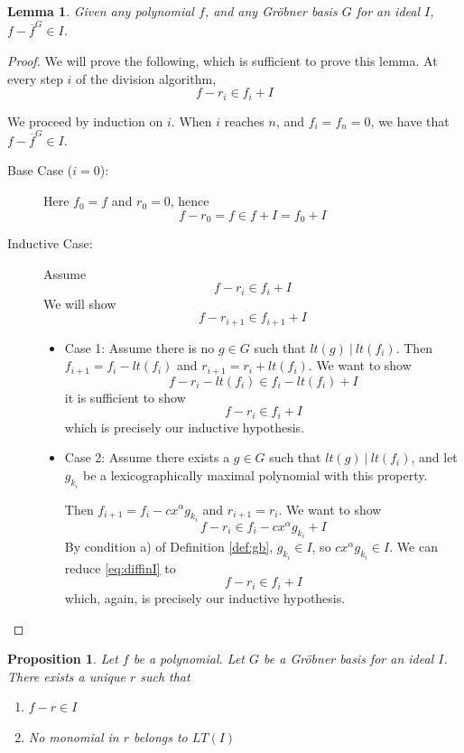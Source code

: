 \documentclass{msthesis}
\newtheorem{lemma}[theorem]{Lemma}
\newtheorem{prop}[theorem]{Proposition}
\theoremstyle{definition}
\begin{document}
\begin{lemma}\label{lemma:remini}
    Given any polynomial $f$, and any Gr\"obner basis $G$ for an ideal $I$, $f - \overline{f}^G \in I$.
\end{lemma}
\begin{proof}
    We will prove the following, which is sufficient to prove this lemma. At every step $i$ of the division algorithm,
    \[ f - r_i \in f_i + I \]

    We proceed by induction on $i$.  When $i$ reaches $n$, and $f_i = f_n = 0$, we have that $f - \overline{f}^G \in I$.

    \begin{description}
        \item[Base Case ($i = 0$):] Here $f_0 = f$ and $r_0 = 0$, hence 
        \[ f-r_0 = f \in f + I = f_0 + I \]
        \item[Inductive Case: ] Assume 
        \[ f - r_i \in f_i + I \]
        We will show
        \[ f - r_{i+1} \in  f_{i+1} + I \]
        \begin{itemize}[nosep]
            \item Case 1: Assume there is no $g \in G$ such that $lt(g)\ |\ lt(f_i)$.
            Then $f_{i+1} = f_i - lt(f_i)$
            and $r_{i+1} = r_i + lt(f_i)$.
            We want to show
            \[ f - r_i - lt(f_i) \in f_i - lt(f_i) + I\]
            it is sufficient to show
            \[ f - r_{i} \in  f_{i} + I \]
            which is precisely our inductive hypothesis.
            \item Case 2: Assume there exists a $g \in G$ such that $lt(g)\ |\ lt(f_i)$, and let $g_{k_i}$ be a lexicographically maximal polynomial with this property. 
            
            Then $f_{i+1} = f_i - cx^\alpha g_{k_i}$
            and $r_{i+1} = r_i$.
            We want to show
            \begin{equation}\label{eq:diffinI}
                f - r_i \in f_i - cx^\alpha g_{k_i} + I
            \end{equation}
            By condition a) of Definition \ref{def:gb}, $g_{k_i} \in I$, so $cx^\alpha g_{k_i} \in I$.  We can reduce \eqref{eq:diffinI} to
            \[ f - r_i \in f_i + I \]
            which, again, is precisely our inductive hypothesis. \qedhere
        \end{itemize}
    \end{description}
\end{proof}
\begin{prop}\label{prop:uniquer}
    Let $f$ be a polynomial.  Let $G$ be a Gr\"obner basis for an ideal $I$.  There exists a unique $r$ such that
    \begin{enumerate}[label=\alph*),nosep]
        \item $f - r \in I$
        \item No monomial in $r$ belongs to $LT(I)$
    \end{enumerate}
\end{prop}
\end{document}
